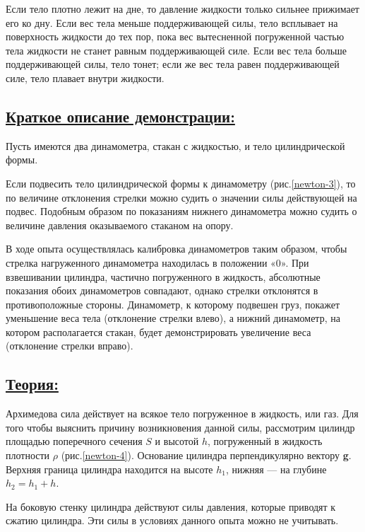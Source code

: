\documentclass[14pt,a4paper,oneside]{extarticle}	%
\begin{document}
Если тело плотно лежит на дне, то давление жидкости только сильнее прижимает его ко дну. 
Если вес тела меньше поддерживающей силы, тело всплывает на поверхность жидкости до тех пор, пока вес вытесненной погруженной частью тела жидкости не станет равным поддерживающей силе. Если вес тела больше поддерживающей силы, тело тонет; если же вес тела равен поддерживающей силе, тело плавает внутри жидкости.

\newpage
\subsection*{\underline{Краткое описание демонстрации:}}

Пусть имеются два динамометра, стакан с жидкостью, и тело цилиндрической формы.

Если подвесить тело цилиндрической формы к динамометру (рис.\ref{newton-3}), то по величине отклонения стрелки можно судить о значении силы действующей на подвес.
Подобным образом по показаниям нижнего динамометра можно судить о величине давления оказываемого стаканом на опору.

В ходе опыта осуществлялась калибровка динамометров таким образом, чтобы стрелка нагруженного динамометра находилась в положении «0».
При взвешивании цилиндра, частично погруженного в жидкость, абсолютные показания обоих динамометров совпадают, однако стрелки отклонятся в противоположные стороны.
Динамометр, к которому подвешен груз, покажет уменьшение веса тела (отклонение стрелки влево), а нижний динамометр, на котором располагается стакан, будет демонстрировать увеличение веса (отклонение стрелки вправо).   

\newpage
\subsection*{\underline{Теория:}}

Архимедова сила действует на всякое тело погруженное в жидкость, или газ.
Для того чтобы выяснить причину возникновения данной силы, рассмотрим цилиндр площадью поперечного сечения $ S $ и высотой $ h $, погруженный в жидкость плотности $\rho$ (рис.\ref{newton-4}). 
Основание цилиндра перпендикулярно вектору \textbf{g}. 
Верхняя граница цилиндра находится на высоте $ h_{1} $, нижняя — на глубине $ h_{2} = h_{1} + h $.

На боковую стенку цилиндра действуют силы давления, которые приводят к сжатию цилиндра.
Эти силы в условиях данного опыта можно не учитывать.
\end{document}
